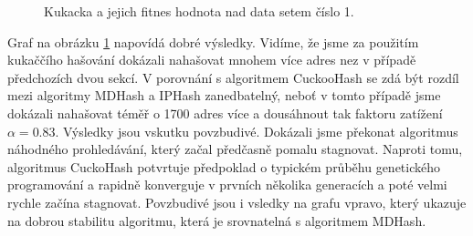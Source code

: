 \begin{figure}[!ht]
	\centering
	\caption{Kukacka a jejich fitnes hodnota nad data setem číslo 1.}
	\label{fig:cuckooComparison1}
\end{figure}

Graf na obrázku \ref{fig:cuckooComparison1} napovídá dobré výsledky. Vidíme, že jsme za použitím kukaččího hašování 
dokázali nahašovat mnohem více adres nez v případě předchozích dvou sekcí. V porovnání s algoritmem CuckooHash se zdá
být rozdíl mezi algoritmy MDHash a IPHash zanedbatelný, neboť v tomto případě jsme dokázali nahašovat téměř o 1700 adres
více a dousáhnout tak faktoru zatížení $\alpha = 0.83$. Výsledky jsou vskutku povzbudivé. Dokázali jsme překonat algoritmus
náhodného prohledávání, který začal předčasně 
pomalu stagnovat. Naproti tomu, algoritmus CuckoHash potvrtuje předpoklad o typickém průběhu genetického programování a 
rapidně konverguje v prvních několika generacích a poté velmi rychle začína stagnovat. Povzbudivé jsou i vsledky na grafu
vpravo, který ukazuje na dobrou stabilitu algoritmu, která je srovnatelná s algoritmem MDHash.

